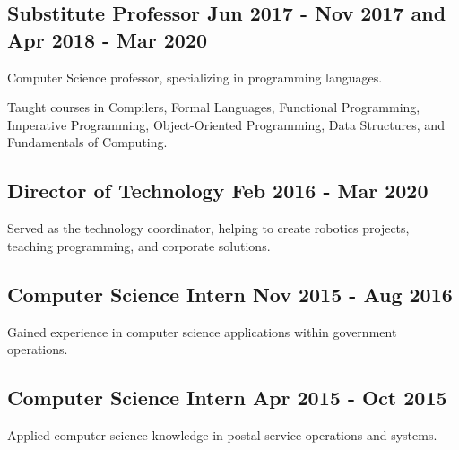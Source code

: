 \documentclass[letter,10pt]{article}
\begin{document}
\subsection{{Substitute Professor \hfill Jun 2017 - Nov 2017 and Apr 2018 - Mar 2020}}
\begin{zitemize}
\item Computer Science professor, specializing in programming languages.
\item Taught courses in Compilers, Formal Languages, Functional Programming, Imperative Programming, Object-Oriented Programming, Data Structures, and Fundamentals of Computing.
\end{zitemize}

\subsection{{Director of Technology \hfill Feb 2016 - Mar 2020}}
\begin{zitemize}
\item Served as the technology coordinator, helping to create robotics projects, teaching programming,  and corporate solutions.
\end{zitemize}

\subsection{{Computer Science Intern \hfill Nov 2015 - Aug 2016}}
\begin{zitemize}
\item Gained experience in computer science applications within government operations.
\end{zitemize}

\subsection{{Computer Science Intern \hfill Apr 2015 - Oct 2015}}
\begin{zitemize}
\item Applied computer science knowledge in postal service operations and systems.
\end{zitemize}
\end{document}
